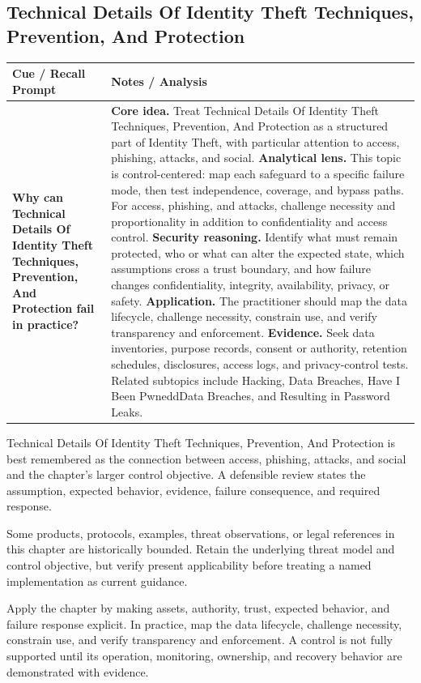 \documentclass[11pt]{article}
\newcommand{\CornellHeader}{%
\rowcolor{Navy}\color{white}\bfseries Cue / Recall Prompt & \color{white}\bfseries Notes / Analysis\\\hline}
\newcommand{\CornellRow}[2]{%
\cellcolor{CueGray}\RaggedRight\textbf{#1} & \RaggedRight #2\\\hline}
\begin{document}
\subsection*{Technical Details Of Identity Theft Techniques, Prevention, And Protection}
\begin{longtable}{>{\RaggedRight\arraybackslash}p{}|>{\RaggedRight\arraybackslash}p{}}
\CornellHeader
\CornellRow{Why can Technical Details Of Identity Theft Techniques, Prevention, And Protection fail in practice?}{\textbf{Core idea.} Treat Technical Details Of Identity Theft Techniques, Prevention, And Protection as a structured part of Identity Theft, with particular attention to access, phishing, attacks, and social. \textbf{Analytical lens.} This topic is control-centered: map each safeguard to a specific failure mode, then test independence, coverage, and bypass paths. For access, phishing, and attacks, challenge necessity and proportionality in addition to confidentiality and access control. \textbf{Security reasoning.} Identify what must remain protected, who or what can alter the expected state, which assumptions cross a trust boundary, and how failure changes confidentiality, integrity, availability, privacy, or safety. \textbf{Application.} The practitioner should map the data lifecycle, challenge necessity, constrain use, and verify transparency and enforcement. \textbf{Evidence.} Seek data inventories, purpose records, consent or authority, retention schedules, disclosures, access logs, and privacy-control tests. Related subtopics include Hacking, Data Breaches, Have I Been PwneddData Breaches, and Resulting in Password Leaks.}
\end{longtable}
\begin{topicsummary}
Technical Details Of Identity Theft Techniques, Prevention, And Protection is best remembered as the connection between access, phishing, attacks, and social and the chapter's larger control objective. A defensible review states the assumption, expected behavior, evidence, failure consequence, and required response.
\end{topicsummary}
\begin{historybox}
Some products, protocols, examples, threat observations, or legal references in this chapter are historically bounded. Retain the underlying threat model and control objective, but verify present applicability before treating a named implementation as current guidance.
\end{historybox}
\begin{defensebox}
Apply the chapter by making assets, authority, trust, expected behavior, and failure response explicit. In practice, map the data lifecycle, challenge necessity, constrain use, and verify transparency and enforcement. A control is not fully supported until its operation, monitoring, ownership, and recovery behavior are demonstrated with evidence.
\end{defensebox}
\end{document}
